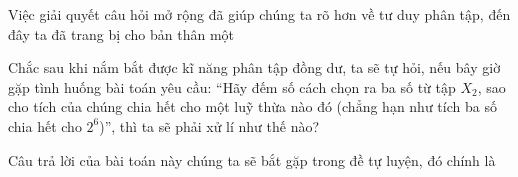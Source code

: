 \documentclass[12pt, a4paper]{article}
\begin{document}
		\vspace{0.3cm}
		
		\noindent Việc giải quyết câu hỏi mở rộng đã giúp chúng ta rõ hơn về tư duy phân tập, đến đây ta đã trang bị cho bản thân một 
		
		\vspace{0.3cm}
		
	 Chắc sau khi nắm bắt được kĩ năng phân tập đồng dư, ta sẽ tự hỏi, nếu bây giờ gặp tình huống bài toán yêu cầu: ``Hãy đếm số cách chọn ra ba số từ tập \(X_2\), sao cho tích của chúng chia hết cho một luỹ thừa nào đó (chẳng hạn như tích ba số chia hết cho \(2^6\))'', thì ta sẽ phải xử lí như thế nào?
		
		\noindent Câu trả lời của bài toán này chúng ta sẽ bắt gặp trong đề tự luyện, đó chính là 
			\vspace{0.3cm}
		
\end{document}
